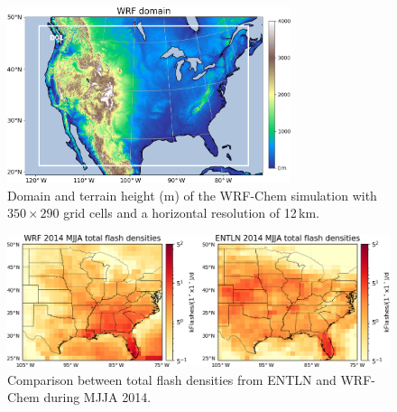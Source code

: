 \documentclass[amt]{copernicus}
\begin{document}
\begin{figure}[t]
    \includegraphics[width=8.3cm]{amt-2019-372-f01.png}
    \caption{Domain and terrain height (m) of the WRF-Chem simulation with $350 \times 290$ grid cells and a horizontal resolution of 12\,km.}
    \label{fig:domain}
\end{figure}

\begin{figure}[t]
    \includegraphics[width=12cm]{amt-2019-372-f02.png}
    \caption{Comparison between total flash densities from ENTLN and WRF-Chem during MJJA 2014.}
    \label{fig:TL}
\end{figure}
\end{document}
